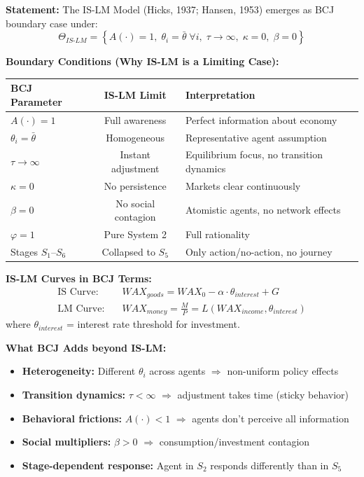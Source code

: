 \begin{tcolorbox}[colback=gray!10!white, colframe=gray!75!black,
    title=Theorem BCJ-T25: IS-LM as Boundary Case]
\textbf{Statement:} The IS-LM Model (Hicks, 1937; Hansen, 1953) emerges as BCJ boundary case under:
\begin{equation}
\Theta_{IS\text{-}LM} = \left\{A(\cdot) = 1, \; \theta_i = \bar{\theta} \; \forall i, \; \tau \to \infty, \; \kappa = 0, \; \beta = 0\right\}
\end{equation}

\textbf{Boundary Conditions (Why IS-LM is a Limiting Case):}
\begin{center}
\begin{tabular}{lcp{7cm}}
\toprule
\textbf{BCJ Parameter} & \textbf{IS-LM Limit} & \textbf{Interpretation} \\
\midrule
$A(\cdot) = 1$ & Full awareness & Perfect information about economy \\
$\theta_i = \bar{\theta}$ & Homogeneous & Representative agent assumption \\
$\tau \to \infty$ & Instant adjustment & Equilibrium focus, no transition dynamics \\
$\kappa = 0$ & No persistence & Markets clear continuously \\
$\beta = 0$ & No social contagion & Atomistic agents, no network effects \\
$\varphi = 1$ & Pure System 2 & Full rationality \\
Stages $S_1$--$S_6$ & Collapsed to $S_5$ & Only action/no-action, no journey \\
\bottomrule
\end{tabular}
\end{center}

\textbf{IS-LM Curves in BCJ Terms:}
\begin{align}
\text{IS Curve:} \quad & WAX_{goods} = WAX_0 - \alpha \cdot \theta_{interest} + G \\
\text{LM Curve:} \quad & WAX_{money} = \frac{M}{P} = L(WAX_{income}, \theta_{interest})
\end{align}
where $\theta_{interest}$ = interest rate threshold for investment.

\textbf{What BCJ Adds beyond IS-LM:}
\begin{itemize}[nosep]
\item \textbf{Heterogeneity:} Different $\theta_i$ across agents $\Rightarrow$ non-uniform policy effects
\item \textbf{Transition dynamics:} $\tau < \infty$ $\Rightarrow$ adjustment takes time (sticky behavior)
\item \textbf{Behavioral frictions:} $A(\cdot) < 1$ $\Rightarrow$ agents don't perceive all information
\item \textbf{Social multipliers:} $\beta > 0$ $\Rightarrow$ consumption/investment contagion
\item \textbf{Stage-dependent response:} Agent in $S_2$ responds differently than in $S_5$
\end{itemize}


\end{tcolorbox}
